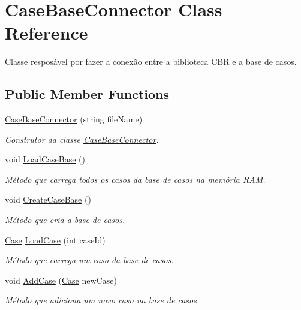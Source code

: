 \hypertarget{class_case_base_connector}{}\section{Case\+Base\+Connector Class Reference}
\label{class_case_base_connector}


Classe resposável por fazer a conexão entre a biblioteca C\+BR e a base de casos.  


\subsection*{Public Member Functions}
\begin{DoxyCompactItemize}
\item 
\hyperlink{class_case_base_connector_adb41d690fb4a06168c15b3b750c0cda2}{Case\+Base\+Connector} (string file\+Name)
\begin{DoxyCompactList}\small\item\em Construtor da classe \hyperlink{class_case_base_connector}{Case\+Base\+Connector}. \end{DoxyCompactList}\item 
void \hyperlink{class_case_base_connector_a6b5e35626b1b6a718bbdba83f153834b}{Load\+Case\+Base} ()
\begin{DoxyCompactList}\small\item\em Método que carrega todos os casos da base de casos na memória R\+AM. \end{DoxyCompactList}\item 
void \hyperlink{class_case_base_connector_a1aa00f0a3bcf25bafa6bab87ec1e455e}{Create\+Case\+Base} ()
\begin{DoxyCompactList}\small\item\em Método que cria a base de casos. \end{DoxyCompactList}\item 
\hyperlink{class_case}{Case} \hyperlink{class_case_base_connector_abca3ec961411fce4948f4ea5b40e9fb6}{Load\+Case} (int case\+Id)
\begin{DoxyCompactList}\small\item\em Método que carrega um caso da base de casos. \end{DoxyCompactList}\item 
void \hyperlink{class_case_base_connector_abfb6f1dae5b06827667d5f033736f7a0}{Add\+Case} (\hyperlink{class_case}{Case} new\+Case)
\begin{DoxyCompactList}\small\item\em Método que adiciona um novo caso na base de casos. \end{DoxyCompactList}\item 

\end{DoxyCompactItemize}
